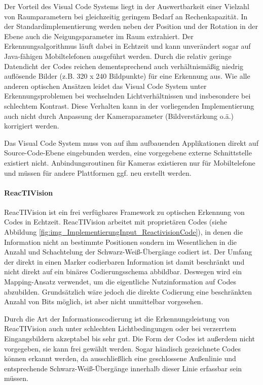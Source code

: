 Der Vorteil des Visual Code Systems liegt in der Auswertbarkeit einer Vielzahl von Raumparametern bei gleichzeitig geringem Bedarf an Rechenkapazität. In der Standardimplementierung werden neben der Position und der Rotation in der Ebene auch die Neigungsparameter im Raum extrahiert. Der Erkennungsalgorithmus läuft dabei in Echtzeit und kann unverändert sogar auf Java-fähigen Mobiltelefonen ausgeführt werden. Durch die relativ geringe Datendicht der Codes reichen dementsprechend auch verhältnismäßig niedrig auflösende Bilder (z.B. 320 x 240 Bildpunkte) für eine Erkennung aus. Wie alle anderen optischen Ansätzen leidet das Visual Code System unter Erkennungsproblemen bei wechselnden Lichtverhältnissen und insbesondere bei schlechtem Kontrast. Diese Verhalten kann in der vorliegenden Implementierung auch nicht durch Anpassung der Kameraparameter (Bildverstärkung o.ä.) korrigiert werden.

Das Visual Code System muss von auf ihm aufbauenden Applikationen direkt auf Source-Code-Ebene eingebunden werden, eine vorgegebene externe Schnittstelle existiert nicht. Anbindungsroutinen für Kameras existieren nur für Mobiltelefone und müssen für andere Plattformen ggf. neu erstellt werden.


\paragraph{ReacTIVision}\label{par:reactivision}
ReacTIVision \citep{Kaltenbrunner07} ist ein frei verfügbares Framework zu optischen Erkennung von Codes in Echtzeit. ReacTIVision arbeitet mit proprietären Codes (siehe Abbildung \ref{fig:img_ImplementierungInput_ReactivisionCode}), in denen die Information nicht an bestimmte Positionen sondern im Wesentlichen in die Anzahl und Schachtelung der Schwarz-Weiß-Übergänge codiert ist. Der Umfang der direkt in einen Marker codierbaren Information ist damit beschränkt und nicht direkt auf ein binäres Codierungsschema abbildbar. Deswegen wird ein Mapping-Ansatz verwendet, um die eigentliche Nutzinformation auf Codes abzubilden. Grundsätzlich wäre jedoch die direkte Codierung eine beschränkten Anzahl von Bits möglich, ist aber nicht unmittelbar vorgesehen.

Durch die Art der Informationscodierung ist die Erkennungsleistung von ReacTIVision auch unter schlechten Lichtbedingungen oder bei verzerrtem Eingangsbildern akzeptabel bis sehr gut. Die Form der Codes ist außerdem nicht vorgegeben, sie kann frei gewählt werden. Sogar händisch gezeichnete Codes können erkannt werden, da ausschließlich eine geschlossene Außenlinie und entsprechende Schwarz-Weiß-Übergänge innerhalb dieser Linie erfassbar sein müssen.

